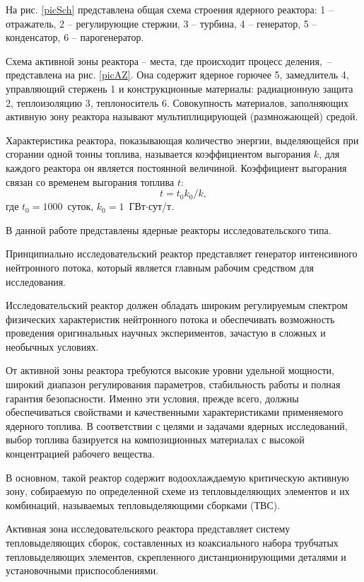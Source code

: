 На рис. \ref{picSch} представлена общая схема строения ядерного реактора: 1 --
отражатель, 2 -- регулирующие стержни, 3 -- турбина, 4 -- генератор, 5 --
конденсатор, 6 -- парогенератор.

Схема активной зоны реактора -- места, где происходит процесс деления,~--
представлена на рис. \ref{picAZ}. Она содержит ядерное горючее 5, замедлитель 4, управляющий
стержень 1 и конструкционные материалы: радиационную защита 2, теплоизоляцию 3,
теплоноситель 6. Совокупность материалов, заполняющих активную зону
реактора называют мультиплицирующей (размножающей) средой.

Характеристика реактора, показывающая количество энергии, выделяющейся при
сгорании одной тонны топлива, называется коэффициентом выгорания \( k \), для
каждого реактора он является постоянной величиной. Коэффициент выгорания связан
со временем выгорания топлива \( t \):
\begin{equation}
    t = t_0 k_0 / k,
    \label{eqTk}
\end{equation}
где \( t_0 = 1000 \)~суток, \( k_0 = 1 \)~ГВт\( \cdot \)сут/т.

В данной работе представлены ядерные реакторы исследовательского типа.

Принципиально исследовательский реактор представляет генератор интенсивного
нейтронного потока, который является главным рабочим средством для исследования.

Исследовательский реактор должен обладать широким регулируемым спектром
физических характеристик нейтронного потока и обеспечивать возможность
проведения оригинальных научных экспериментов, зачастую в сложных и необычных
условиях.

От активной зоны реактора требуются высокие уровни удельной мощности, широкий
диапазон регулирования параметров, стабильность работы и полная гарантия
безопасности. Именно эти условия, прежде всего, должны обеспечиваться
свойствами и качественными характеристиками применяемого ядерного топлива. В
соответствии с целями и задачами ядерных исследований, выбор топлива базируется
на композиционных материалах с высокой концентрацией рабочего вещества.

В основном, такой реактор содержит водоохлаждаемую критическую активную зону,
собираемую по определенной схеме из тепловыделяющих элементов и их комбинаций,
называемых тепловыделяющими сборками (ТВС).

Активная зона исследовательского реактора представляет систему тепловыделяющих
сборок, составленных из коаксиального набора трубчатых тепловыделяющих
элементов, скрепленного дистанционирующими деталями и установочными
приспособлениями.

